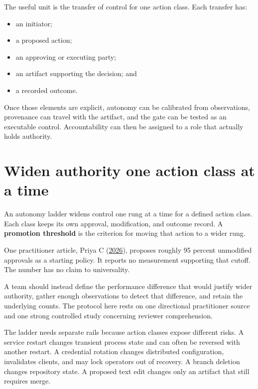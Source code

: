 The useful unit is the transfer of control for one action class. Each transfer has:

\begin{itemize}
\tightlist
\item
  an initiator;
\item
  a proposed action;
\item
  an approving or executing party;
\item
  an artifact supporting the decision; and
\item
  a recorded outcome.
\end{itemize}

Once those elements are explicit, autonomy can be calibrated from observations, provenance can travel with the artifact, and the gate can be tested as an executable control. Accountability can then be assigned to a role that actually holds authority.

\section{Widen authority one action class at a time}\label{widen-authority-one-action-class-at-a-time}

An autonomy ladder widens control one rung at a time for a defined action class. Each class keeps its own approval, modification, and outcome record. A \textbf{promotion threshold} is the criterion for moving that action to a wider rung.

One practitioner article, Priya C (\href{https://devops.com/when-should-a-devops-agent-act-without-human-approval/}{2026}), proposes roughly 95 percent unmodified approvals as a starting policy. It reports no measurement supporting that cutoff. The number has no claim to universality.

A team should instead define the performance difference that would justify wider authority, gather enough observations to detect that difference, and retain the underlying counts. The protocol here rests on one directional practitioner source and one strong controlled study concerning reviewer comprehension.

The ladder needs separate rails because action classes expose different risks. A service restart changes transient process state and can often be reversed with another restart. A credential rotation changes distributed configuration, invalidates clients, and may lock operators out of recovery. A branch deletion changes repository state. A proposed text edit changes only an artifact that still requires merge.

